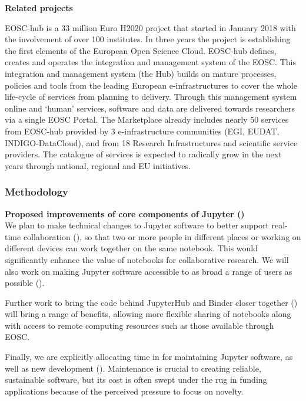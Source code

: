 \medskip
\noindent\textbf{Related projects}

EOSC-hub is a 33 million Euro H2020 project that started in January 2018 with
the involvement of over 100 institutes. In three years the project is
establishing the first elements of the European Open Science Cloud. EOSC-hub
defines, creates and operates the integration and management system of the
EOSC.  This integration and management system (the Hub) builds on mature
processes, policies and tools from the leading European e-infrastructures to
cover the whole life-cycle of services from planning to delivery. Through this
management system online and `human' services, software and data are delivered
towards researchers via a single EOSC Portal. The Marketplace already includes
nearly 50 services from EOSC-hub provided by 3 e-infrastructure communities
(EGI, EUDAT, INDIGO-DataCloud), and from 18 Research Infrastructures and
scientific service providers. The catalogue of services is expected to
radically grow in the next years through national, regional and EU
initiatives.

\subsubsection{Methodology}\label{sec:methodology}


\textbf{Proposed improvements of core components of Jupyter ()}\\
We plan to make technical changes to Jupyter software to better support
real-time collaboration (),
so that two or more people in different places or working on different
devices can work together
on the same notebook. This would significantly enhance the value of
notebooks for collaborative research.
We will also work on making Jupyter software accessible to as broad a
range of users as possible ().

Further work to bring the code behind JupyterHub and Binder closer together
() will bring a range of benefits, allowing more
flexible sharing of notebooks along with access to remote computing resources
such as those available through EOSC.

Finally, we are explicitly allocating time in  for maintaining
Jupyter software, as well as new development ().
Maintenance is crucial to creating reliable, sustainable software,
but its cost is often swept under the rug in funding applications
because of the perceived pressure to focus on novelty.

